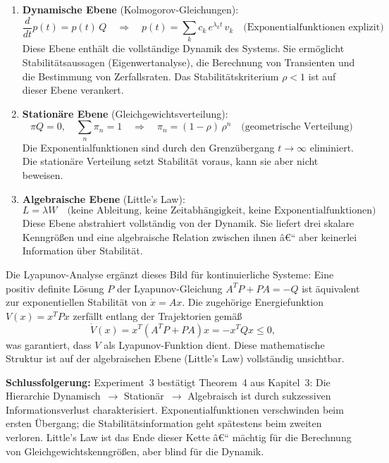 ﻿\documentclass[a4paper,12pt]{report}
\theoremstyle{definition}
\begin{document}
\begin{enumerate}
	\item \textbf{Dynamische Ebene} (Kolmogorov-Gleichungen):
	\[
	\frac{d}{dt}p(t) = p(t)\,Q
	\quad\Rightarrow\quad
	p(t) = \sum_k c_k\,e^{\lambda_k t}\,v_k
	\quad\text{(Exponentialfunktionen explizit)}
	\]
	Diese Ebene enthält die vollständige Dynamik des Systems.
	Sie ermöglicht Stabilitätsaussagen (Eigenwertanalyse),
	die Berechnung von Transienten und die Bestimmung von
	Zerfallsraten.  Das Stabilitätskriterium $\rho < 1$ ist auf
	dieser Ebene verankert.
	
	\item \textbf{Stationäre Ebene} (Gleichgewichtsverteilung):
	\[
	\pi Q = 0, \quad \sum_n \pi_n = 1
	\quad\Rightarrow\quad
	\pi_n = (1-\rho)\,\rho^n
	\quad\text{(geometrische Verteilung)}
	\]
	Die Exponentialfunktionen sind durch den Grenzübergang
	$t \to \infty$ eliminiert.  Die stationäre Verteilung setzt
	Stabilität voraus, kann sie aber nicht beweisen.
	
	\item \textbf{Algebraische Ebene} (Little's Law):
	\[
	L = \lambda W
	\quad\text{(keine Ableitung, keine Zeitabhängigkeit,
		keine Exponentialfunktionen)}
	\]
	Diese Ebene abstrahiert vollständig von der Dynamik.  Sie
	liefert drei skalare Kenngrößen und eine algebraische
	Relation zwischen ihnen â€“ aber keinerlei Information über
	Stabilität.
	
\end{enumerate}

Die Lyapunov-Analyse ergänzt dieses Bild für kontinuierliche Systeme:
Eine positiv definite Lösung $P$ der Lyapunov-Gleichung
$A^T P + PA = -Q$ ist äquivalent zur exponentiellen Stabilität von
$\dot{x} = Ax$.  Die zugehörige Energiefunktion $V(x) = x^T P x$
zerfällt entlang der Trajektorien gemäß
\[
\dot{V}(x) = x^T(A^T P + PA)x = -x^T Q x \leq 0,
\]
was garantiert, dass $V$ als Lyapunov-Funktion dient.  Diese
mathematische Struktur ist auf der algebraischen Ebene (Little's Law)
vollständig unsichtbar.

\textbf{Schlussfolgerung:} Experiment~3 bestätigt Theorem~4 aus
Kapitel~3: Die Hierarchie Dynamisch~$\to$ Stationär~$\to$ Algebraisch
ist durch sukzessiven Informationsverlust charakterisiert.
Exponentialfunktionen verschwinden beim ersten Übergang; die
Stabilitätsinformation geht spätestens beim zweiten verloren.
Little's Law ist das Ende dieser Kette â€“ mächtig für die Berechnung
von Gleichgewichtskenngrößen, aber blind für die Dynamik.
\end{document}

